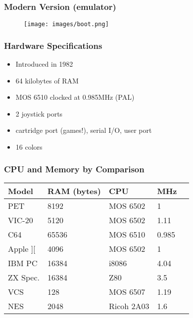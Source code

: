 \documentclass[aspectratio=43]{uva-inf-presentation}
\begin{document}

\begin{frame}
\frametitle{Modern Version (emulator)}

\begin{figure}
\texttt{[image: images/boot.png]}
\end{figure}

\end{frame}


\begin{frame}
\frametitle{Hardware Specifications}

\begin{itemize}
\item Introduced in 1982
\item 64 kilobytes of RAM
\item MOS 6510 clocked at 0.985MHz (PAL)
\item 2 joystick ports
\item cartridge port (games!), serial I/O, user port
\item 16 colors
\end{itemize}

\end{frame}


\begin{frame}
\frametitle{CPU and Memory by Comparison}

\begin{tabular}{|l|l|l|l|l|}
\hline Model & RAM (bytes) & CPU & MHz \\ \hline
PET & 8192 & MOS 6502 & 1 \\
VIC-20 & 5120 & MOS 6502 & 1.11 \\
C64 & 65536 & MOS 6510 & 0.985 \\ \hline
Apple ][ & 4096 & MOS 6502 & 1 \\
IBM PC & 16384 & i8086 & 4.04 \\
ZX Spec. & 16384 & Z80 & 3.5 \\ \hline
VCS & 128 & MOS 6507 & 1.19 \\
NES & 2048 & Ricoh 2A03 & 1.6 \\ \hline
\end{tabular}

\end{frame}

\end{document}
